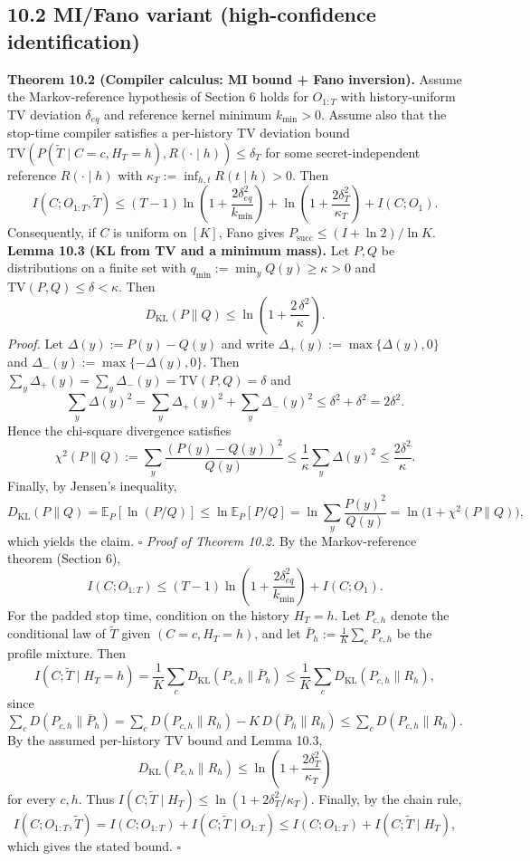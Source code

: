 \documentclass[11pt]{article}
\begin{document}
\hypertarget{mifano-variant-high-confidence-identification}{%
\subsection{10.2 MI/Fano variant (high-confidence
identification)}\label{mifano-variant-high-confidence-identification}}

\textbf{Theorem 10.2 (Compiler calculus: MI bound + Fano inversion).}
Assume the Markov-reference hypothesis of Section 6 holds for
\(O_{1:T}\) with history-uniform TV deviation \(\delta_{eq}\) and
reference kernel minimum \(k_{\min}>0\). Assume also that the stop-time
compiler satisfies a per-history TV deviation bound
\(\mathrm{TV}(P(\widetilde T\mid C=c,H_T=h), R(\cdot\mid h))\le \delta_T\)
for some secret-independent reference \(R(\cdot\mid h)\) with
\(\kappa_T:=\inf_{h,t}R(t\mid h)>0\). Then \[
I(C;O_{1:T},\widetilde T) \le (T-1)\ln\!\left(1+\frac{2\delta_{eq}^2}{k_{\min}}\right) + \ln\!\left(1+\frac{2\delta_T^2}{\kappa_T}\right) + I(C;O_1).
\] Consequently, if \(C\) is uniform on \([K]\), Fano gives
\(P_{\mathrm{succ}}\le (I+\ln 2)/\ln K\). \textbf{Lemma 10.3 (KL from TV
and a minimum mass).} Let \(P,Q\) be distributions on a finite set with
\(q_{\min}:=\min_y Q(y)\ge \kappa>0\) and
\(\mathrm{TV}(P,Q)\le \delta<\kappa\). Then \[
D_{\mathrm{KL}}(P\|Q)\le \ln\!\left(1+\frac{2\,\delta^2}{\kappa}\right).
\] \emph{Proof.} Let \(\Delta(y):=P(y)-Q(y)\) and write
\(\Delta_+(y):=\max\{\Delta(y),0\}\) and
\(\Delta_-(y):=\max\{-\Delta(y),0\}\). Then
\(\sum_y \Delta_+(y)=\sum_y \Delta_-(y)=\mathrm{TV}(P,Q)=\delta\) and \[
\sum_y \Delta(y)^2 = \sum_y \Delta_+(y)^2 + \sum_y \Delta_-(y)^2 \le \delta^2+\delta^2 = 2\delta^2.
\] Hence the chi-square divergence satisfies \[
\chi^2(P\|Q):=\sum_y \frac{(P(y)-Q(y))^2}{Q(y)} \le \frac{1}{\kappa}\sum_y \Delta(y)^2 \le \frac{2\delta^2}{\kappa}.
\] Finally, by Jensen's inequality, \[
D_{\mathrm{KL}}(P\|Q)=\mathbb{E}_P[\ln(P/Q)]\le \ln\mathbb{E}_P[P/Q]
= \ln\sum_y \frac{P(y)^2}{Q(y)} = \ln\!\bigl(1+\chi^2(P\|Q)\bigr),
\] which yields the claim. \(\square\) \emph{Proof of Theorem 10.2.} By
the Markov-reference theorem (Section 6), \[
I(C;O_{1:T})\le (T-1)\ln\!\left(1+\frac{2\delta_{eq}^2}{k_{\min}}\right)+ I(C;O_1).
\] For the padded stop time, condition on the history \(H_T=h\). Let
\(P_{c,h}\) denote the conditional law of \(\widetilde T\) given
\((C=c,H_T=h)\), and let \(\bar P_h:=\frac1K\sum_c P_{c,h}\) be the
profile mixture. Then \[
I(C;\widetilde T\mid H_T=h)=\frac1K\sum_c D_{\mathrm{KL}}(P_{c,h}\|\bar P_h)\le \frac1K\sum_c D_{\mathrm{KL}}(P_{c,h}\|R_h),
\] since
\(\sum_c D(P_{c,h}\|\bar P_h)=\sum_c D(P_{c,h}\|R_h)-K\,D(\bar P_h\|R_h)\le \sum_c D(P_{c,h}\|R_h)\).
By the assumed per-history TV bound and Lemma 10.3, \[
D_{\mathrm{KL}}(P_{c,h}\|R_h)\le \ln\!\left(1+\frac{2\delta_T^2}{\kappa_T}\right)
\] for every \(c,h\). Thus
\(I(C;\widetilde T\mid H_T)\le \ln(1+2\delta_T^2/\kappa_T)\). Finally,
by the chain rule, \[
I(C;O_{1:T},\widetilde T)=I(C;O_{1:T})+I(C;\widetilde T\mid O_{1:T})
\le I(C;O_{1:T})+I(C;\widetilde T\mid H_T),
\] which gives the stated bound. \(\square\)
\end{document}
